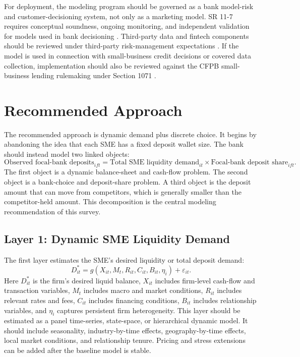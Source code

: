 \documentclass[11pt]{article}
\begin{document}
For deployment, the modeling program should be governed as a bank model-risk
and customer-decisioning system, not only as a marketing model. SR 11-7 requires
conceptual soundness, ongoing monitoring, and independent validation for models
used in bank decisioning \citep{fed2011sr1107}. Third-party data and fintech
components should be reviewed under third-party risk-management expectations
\citep{fed2023sr2304}. If the model is used in connection with small-business
credit decisions or covered data collection, implementation should also be
reviewed against the CFPB small-business lending rulemaking under Section 1071
\citep{cfpb2023section1071}.

\section{Recommended Approach}

The recommended approach is dynamic demand plus discrete choice. It begins by
abandoning the idea that each SME has a fixed deposit wallet size. The bank
should instead model two linked objects:
\[
  \text{Observed focal-bank deposits}_{ift}
  =
  \text{Total SME liquidity demand}_{it}
  \times
  \text{Focal-bank deposit share}_{ift}.
\]
The first object is a dynamic balance-sheet and cash-flow problem. The second
object is a bank-choice and deposit-share problem. A third object is the
deposit amount that can move from competitors, which is generally
smaller than the competitor-held amount. This decomposition is the central
modeling recommendation of this survey.

\subsection{Layer 1: Dynamic SME Liquidity Demand}

The first layer estimates the SME's desired liquidity or total deposit demand:
\[
  D_{it}^{*}
  =
  g(X_{it}, M_t, R_{it}, C_{it}, B_{it}, \eta_i) + \varepsilon_{it}.
\]
Here $D_{it}^{*}$ is the firm's desired liquid balance, $X_{it}$ includes
firm-level cash-flow and transaction variables, $M_t$ includes macro and market
conditions, $R_{it}$ includes relevant rates and fees, $C_{it}$ includes
financing conditions, $B_{it}$ includes relationship variables, and $\eta_i$
captures persistent firm heterogeneity. This layer should be estimated as a
panel time-series, state-space, or hierarchical dynamic model. It should include
seasonality, industry-by-time effects, geography-by-time effects, local market
conditions, and relationship tenure. Pricing and stress extensions can be added
after the baseline model is stable.
\end{document}
